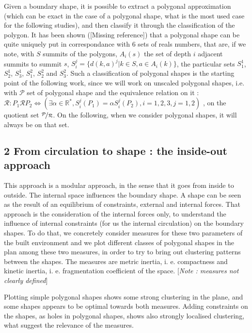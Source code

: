 \documentclass[english]{article}
\begin{document}
Given a boundary shape, it is possible to extract a polygonal approximation
(which can be exact in the case of a polygonal shape, what is the
most used case for the following studies), and then classify it through
the classification of the polygon. It has been shown ({[}Missing reference{]})
that a polygonal shape can be quite uniquely put in correspondance
with 6 sets of reals numbers, that are, if we note, with $S$ summits
of the polygons, $A_{i}(s)$ the set of depth $i$ adjacent summits
to summit $s$, $S_{i}^{j}=\{d(k,a)^{j}|k\in S,a\in A_{i}(k)\}$,
the particular sets $S_{1}^{1}$, $S_{2}^{1}$, $S_{3}^{1}$, $S_{1}^{2}$,
$S_{2}^{2}$ and $S_{3}^{2}$. Such a classification of polygonal
shapes is the starting point of the following work, since we will
work on unscaled polygonal shapes, i.e. with $\mathcal{P}$ set of
polygonal shape and the equivalence relation on it : $\mathcal{R}:P_{1}\mathcal{R}P_{2}\iff(\exists\alpha\in\mathbb{R}^{*},S_{i}^{j}(P_{1})=\alpha S_{i}^{j}(P_{2}),i=1,2,3,j=1,2)$
, on the quotient set $\nicefrac{\mathcal{P}}{\mathcal{R}}$. On the
following, when we consider polygonal shapes, it will always be on
that set.


\subsection*{2 From circulation to shape : the inside-out approach}

This approach is a modular approach, in the sense that it goes from
inside to outside. The internal space influences the boundary shape.
A shape can be seen as the result of an equilibrium of constraints,
external and internal forces. That approach is the consideration of
the internal forces only, to understand the influence of internal
constraints (for us the internal circulation) on the boundary shapes.
To do that, we concretely consider measures for these two parameters
of the built environment and we plot different classes of polygonal
shapes in the plan among these two measures, in order to try to bring
out clustering patterns between the shapes. The measures are metric
inertia, i. e. compactness and kinetic inertia, i. e. fragmentation
coefficient of the space. {[}\textit{Note : measures not clearly defined}{]}

\bigskip{}


Plotting simple polygonal shapes shows some strong clustering in the
plane, and some shapes appears to be optimal towards both measures.
Adding constraints on the shapes, as holes in polygonal shapes, shows
also strongly localised clustering, what suggest the relevance of
the measures.
\end{document}
